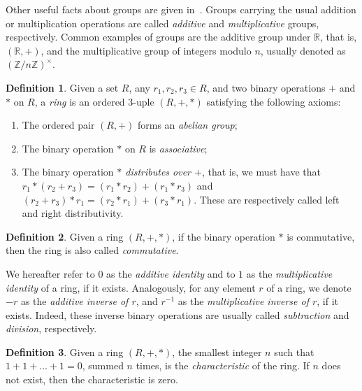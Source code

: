 \documentclass[draft, 12pt, a4paper, oneside]{memoir}
\theoremstyle{definition}
\newtheorem{definition}{Definition}[section]
\theoremstyle{remark}
\begin{document}
Other useful facts about groups are given in~\cite[Prop. 1]{}. Groups carrying the usual addition or multiplication operations are called \emph{additive} and \emph{multiplicative} groups, respectively. Common examples of groups are the additive group under $\mathbb{R}$, that is, $(\mathbb{R}, +)$, and the multiplicative group of integers modulo $n$, usually denoted as $(\mathbb{Z}/n\mathbb{Z})^{\times}$.

\begin{definition}
  Given a set $R$, any $r_{1}, r_{2}, r_{3} \in R$, and two binary operations $+$ and $\ast$ on $R$, a \emph{ring} is an ordered 3-uple $(R, +, \ast)$ satisfying the following axioms:
  
  \begin{enumerate}
    \item The ordered pair $(R, +)$ forms an \emph{abelian group};
    \item The binary operation $\ast$ on $R$ is \emph{associative};
    \item The binary operation \emph{$\ast$ distributes over $+$}, that is, we must have that $r_{1} \ast (r_{2} + r_{3}) = (r_{1} \ast r_{2}) + (r_{1} \ast r_{3})$ and $(r_{2} + r_{3}) \ast r_{1} = (r_{2} \ast r_{1}) + (r_{3} \ast r_{1})$. These are respectively called left and right distributivity.
  \end{enumerate}
\end{definition}

\begin{definition}
  Given a ring $(R, +, \ast)$, if the binary operation $\ast$ is commutative, then the ring is also called \emph{commutative}.
\end{definition}

We hereafter refer to $0$ as the \emph{additive identity} and to $1$ as the \emph{multiplicative identity} of a ring, if it exists. Analogously, for any element $r$ of a ring, we denote $-r$ as the \emph{additive inverse of $r$}, and $r^{-1}$ as the \emph{multiplicative inverse of $r$}, if it exists. Indeed, these inverse binary operations are usually called \emph{subtraction} and \emph{division}, respectively.

\begin{definition}
  Given a ring $(R, +, \ast)$, the smallest integer $n$ such that $1 + 1 + \dots + 1 = 0$, summed $n$ times, is the \emph{characteristic} of the ring. If $n$ does not exist, then the characteristic is zero.
\end{definition}
\end{document}
